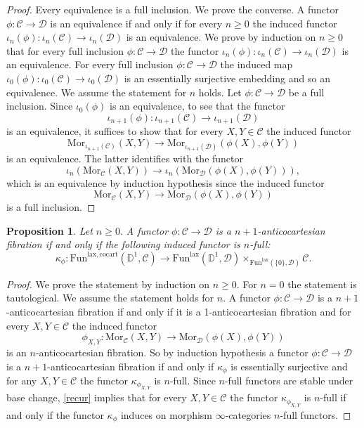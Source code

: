 \documentclass[10pt,oneside]{article}
\numberwithin{equation}{section} %
\numberwithin{figure}{section} %
\theoremstyle{plain}
\newtheorem{proposition}[theorem]{Proposition}
\theoremstyle{definition}
\newcommand{\bD}{{\mathbb D}}
\newcommand{\mC}{{\mathcal C}}
\newcommand{\mD}{{\mathcal D}}
\newcommand{\Fun}{\mathrm{Fun}}
\newcommand{\cocart}{{\mathrm{cocart}}}
\newcommand{\lax}{{\mathrm{lax}}}
\newcommand{\Mor}{{\mathrm{Mor}}}
\begin{document}
\begin{proof}
Every equivalence is a full inclusion. We prove the converse.
A functor $\phi:\mC \to \mD$ is an equivalence if and only if for every
$n \geq 0$ the induced functor $\iota_n(\phi): \iota_n(\mC) \to \iota_n(\mD) $ is an equivalence.
We prove by induction on $n \geq 0 $ that for every full inclusion
$\phi: \mC \to \mD$ the functor 
$\iota_n(\phi): \iota_n(\mC) \to \iota_n(\mD) $ is an equivalence.
For every full inclusion
$\phi: \mC \to \mD$ the induced map 
$\iota_0(\phi): \iota_0(\mC) \to \iota_0(\mD) $ is an essentially surjective embedding and so an equivalence.
We assume the statement for $n$ holds.
Let
$\phi: \mC \to \mD$ be a full inclusion.
Since $\iota_0(\phi)$ is an equivalence, to see that the functor
$$\iota_{n+1}(\phi): \iota_{n+1}(\mC) \to \iota_{n+1}(\mD) $$ is an equivalence, it suffices to show that for every $X,Y \in \mC$
the induced functor $$ \Mor_{\iota_{n+1}(\mC)}(X,Y) \to \Mor_{\iota_{n+1}(\mD)}(\phi(X),\phi(Y)) $$ is an equivalence.
The latter identifies with the functor
$$ \iota_n(\Mor_{\mC}(X,Y)) \to \iota_n(\Mor_{\mD}(\phi(X),\phi(Y))),$$
which is an equivalence by induction hypothesis since the induced functor $$\Mor_{\mC}(X,Y) \to \Mor_{\mD}(\phi(X),\phi(Y)) $$
is a full inclusion.
\end{proof}

\begin{proposition}\label{cocfull}
Let $n \geq 0.$
A functor $\phi: \mC \to \mD$ is a $n+1$-anticocartesian fibration
if and only if the following induced functor is $n$-full:
$$\kappa_\phi: \Fun^{\lax, \cocart}(\bD^1,\mC) \to \Fun^\lax(\bD^1,\mD) \times_{\Fun^\lax(\{0\},\mD)} \mC.$$ 
\end{proposition}

\begin{proof}
We prove the statement by induction on $n \geq 0.$
For $n=0$ the statement is tautological.
We assume the statement holds for $n.$
A functor $\phi:\mC \to \mD$ is a $n+1$-anticocartesian fibration if and only if it is a 1-anticocartesian fibration and for every $X,Y \in \mC$
the induced functor $$\phi_{X,Y}: \Mor_\mC(X,Y) \to \Mor_\mD(\phi(X),\phi(Y))$$ is an $n$-anticocartesian fibration.
So by induction hypothesis a functor $\phi:\mC \to \mD$ is a $n+1$-anticocartesian fibration if and only if $\kappa_\phi$ is essentially surjective and for any $X,Y \in \mC$ the functor $\kappa_{\phi_{X,Y}}$ is $n$-full.
Since $n$-full functors are stable under base change,
\cref{recur} implies that for every $X,Y \in \mC$
the functor $\kappa_{\phi_{X,Y}}$ is $n$-full if and only if
the functor $\kappa_\phi$ induces on morphism $\infty$-categories $n$-full functors.  
\end{proof}
\end{document}
